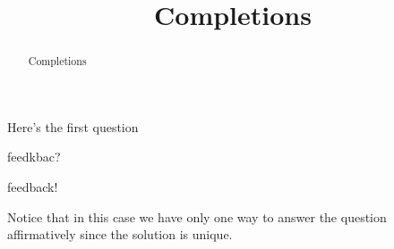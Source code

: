 \documentclass{ximera}
\title{Completions}
\begin{document}
\begin{abstract}
  Completions
\end{abstract}
\maketitle

  \begin{question}
    Here's the first question
    \begin{multipleChoice}
    \end{multipleChoice}
    feedkbac?
    \begin{feedback}[correct]
      feedback!
      \begin{question}
        \begin{multipleChoice}
        \end{multipleChoice}

        \begin{feedback}[correct]
          Notice that in this case we have only one way to answer the
          question affirmatively since the solution is unique.
        \end{feedback}
      \end{question}
    \end{feedback}
  \end{question}
\end{document}
